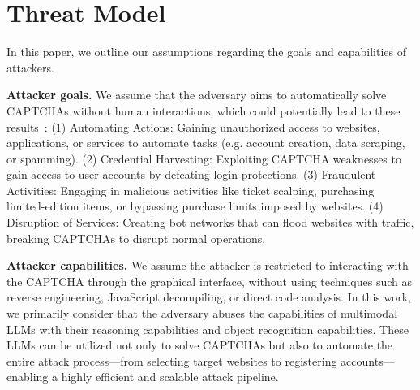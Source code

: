 \section{Threat Model}
In this paper, we outline our assumptions regarding the goals and capabilities of attackers.

\noindent\textbf{Attacker goals.} We assume that the adversary aims to automatically solve CAPTCHAs without human interactions, which could potentially lead to these results~\cite{che2021augmented,shi2020text}:
(1) Automating Actions: Gaining unauthorized access to websites, applications, or services to automate tasks (e.g. account creation, data scraping, or spamming). (2) Credential Harvesting: Exploiting CAPTCHA weaknesses to gain access to user accounts by defeating login protections. (3) Fraudulent Activities: Engaging in malicious activities like ticket scalping, purchasing limited-edition items, or bypassing purchase limits imposed by websites. (4) Disruption of Services: Creating bot networks that can flood websites with traffic, breaking CAPTCHAs to disrupt normal operations.


\noindent\textbf{Attacker capabilities.} We assume the attacker is restricted to interacting with the CAPTCHA through the graphical interface, without using techniques such as reverse engineering, JavaScript decompiling, or direct code analysis. In this work, we primarily consider that the adversary abuses the capabilities of multimodal LLMs with their reasoning capabilities and object recognition capabilities. These LLMs can be utilized not only to solve CAPTCHAs but also to automate the entire attack process—from selecting target websites to registering accounts—enabling a highly efficient and scalable attack pipeline.


